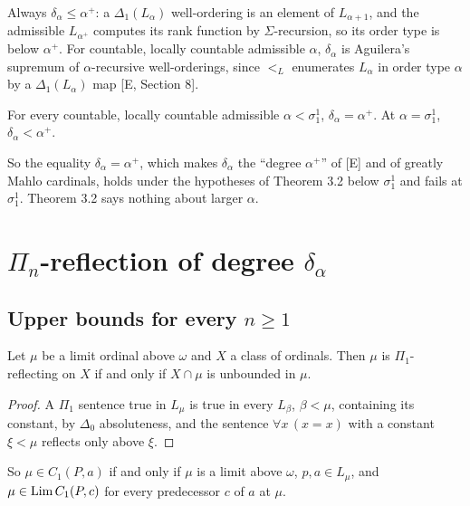 \documentclass[11pt]{article}
\begin{document}
Always $\delta_\alpha \le \alpha^+$: a $\Delta_1(L_\alpha)$ well-ordering is an element of $L_{\alpha+1}$, and the
admissible $L_{\alpha^+}$ computes its rank function by $\Sigma$-recursion, so its order type is below $\alpha^+$. For
countable, locally countable admissible $\alpha$, $\delta_\alpha$ is Aguilera's supremum of $\alpha$-recursive
well-orderings, since $<_L$ enumerates $L_\alpha$ in order type $\alpha$ by a $\Delta_1(L_\alpha)$ map [E, Section 8].

\begin{statement} For every countable, locally
countable admissible $\alpha < \sigma^1_1$, $\delta_\alpha = \alpha^+$. At $\alpha = \sigma^1_1$, $\delta_\alpha <
\alpha^+$.
\end{statement}

So the equality $\delta_\alpha = \alpha^+$, which makes $\delta_\alpha$ the ``degree $\alpha^+$'' of [E] and of
greatly Mahlo cardinals, holds under the hypotheses of Theorem 3.2 below $\sigma^1_1$ and fails at $\sigma^1_1$.
Theorem 3.2 says nothing about larger $\alpha$.

\section{\texorpdfstring{$\Pi_n$-reflection of degree $\delta_\alpha$}{Pi\_n-reflection of degree delta\_alpha}}

\subsection{\texorpdfstring{Upper bounds for every $n \ge 1$}{Upper bounds for every n >= 1}}

\begin{statement} Let $\mu$ be a limit ordinal above $\omega$ and $X$ a class of ordinals. Then $\mu$ is
$\Pi_1$-reflecting on $X$ if and only if $X \cap \mu$ is unbounded in $\mu$.
\end{statement}

\begin{proof}
A $\Pi_1$ sentence true in $L_\mu$ is true in every $L_\beta$, $\beta < \mu$, containing its constant, by $\Delta_0$
absoluteness, and the sentence $\forall x\, (x = x)$ with a constant $\xi < \mu$ reflects only above $\xi$.
\end{proof}

So $\mu \in C_1(P,a)$ if and only if $\mu$ is a limit above $\omega$, $p, a \in L_\mu$, and $\mu \in \mathrm{Lim}\, C_1(P,c)$ for
every predecessor $c$ of $a$ at $\mu$.
\end{document}

